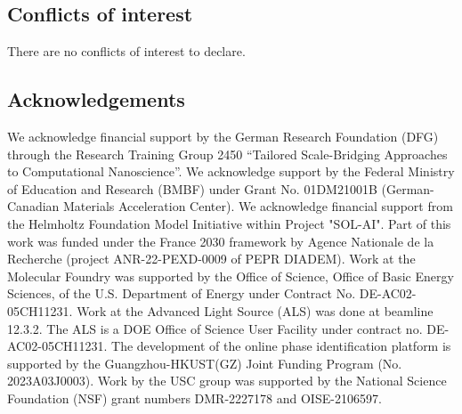 \documentclass[a4paper]{article}
\begin{document}
\subsection*{Conflicts of interest}
There are no conflicts of interest to declare.

\subsection*{Acknowledgements}
We acknowledge financial support by the German Research Foundation (DFG) through the Research Training Group 2450 “Tailored Scale-Bridging Approaches to Computational Nanoscience”. We acknowledge support by the Federal Ministry of Education and Research (BMBF) under Grant No. 01DM21001B (German-Canadian Materials Acceleration Center). We acknowledge financial support from the Helmholtz Foundation Model Initiative within Project "SOL-AI". Part of this work was funded under the France 2030 framework by Agence Nationale de la Recherche (project ANR-22-PEXD-0009 of PEPR DIADEM). Work at the Molecular Foundry was supported by the Office of Science, Office of Basic Energy Sciences, of the U.S. Department of Energy under Contract No. DE-AC02-05CH11231. Work at the Advanced Light Source (ALS) was done at beamline 12.3.2. The ALS is a DOE Office of Science User Facility under contract no. DE-AC02-05CH11231. The development of the online phase identification platform is supported by the Guangzhou-HKUST(GZ) Joint Funding Program (No. 2023A03J0003). Work by the USC group was supported by the National Science Foundation (NSF) grant numbers DMR-2227178 and OISE-2106597. 




\printnomenclature

\clearpage



\end{document}
